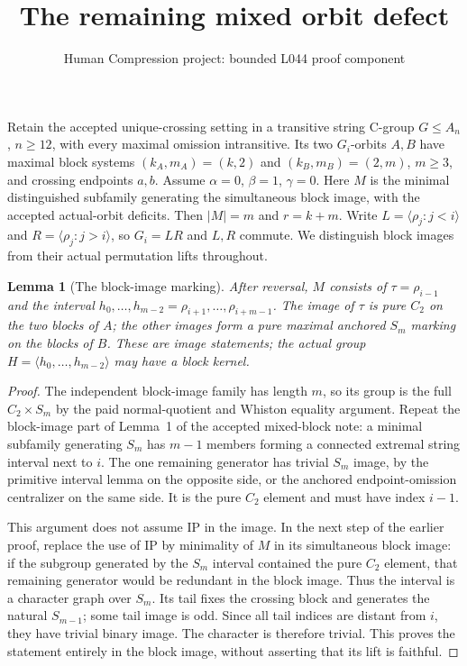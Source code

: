 \documentclass[11pt,a4paper]{article}
\title{The remaining mixed orbit defect}
\author{Human Compression project: bounded L044 proof component}
\date{}
\newtheorem{lemma}{Lemma}
\newcommand{\gen}[1]{\langle#1\rangle}
\begin{document}
\maketitle
Retain the accepted unique-crossing setting in a transitive string
C-group $G\leq A_n$, $n\geq12$, with every maximal omission
intransitive. Its two $G_i$-orbits $A,B$ have maximal block systems
$(k_A,m_A)=(k,2)$ and $(k_B,m_B)=(2,m)$, $m\geq3$, and crossing
endpoints $a,b$. Assume $\alpha=0$, $\beta=1$, $\gamma=0$.
Here $M$ is the minimal distinguished subfamily generating the
simultaneous block image, with the accepted actual-orbit deficits.
Then $|M|=m$ and $r=k+m$. Write
$L=\gen{\rho_j:j<i}$ and $R=\gen{\rho_j:j>i}$, so
$G_i=LR$ and $L,R$ commute. We distinguish block images from their
actual permutation lifts throughout.

\begin{lemma}[The block-image marking]
After reversal, $M$ consists of $\tau=\rho_{i-1}$ and the interval
$h_0,\ldots,h_{m-2}=\rho_{i+1},\ldots,\rho_{i+m-1}$.
The image of $\tau$ is pure $C_2$ on the two blocks of $A$;
the other images form a pure maximal anchored $S_m$ marking
on the blocks of $B$. These are image statements; the actual
group $H=\gen{h_0,\ldots,h_{m-2}}$ may have a block kernel.
\end{lemma}
\begin{proof}
The independent block-image family has length $m$, so its group
is the full $C_2\times S_m$ by the paid normal-quotient and
Whiston equality argument. Repeat the block-image part of Lemma~1
of the accepted mixed-block note: a minimal subfamily generating
$S_m$ has $m-1$ members forming a connected extremal string
interval next to $i$. The one remaining generator has trivial
$S_m$ image, by the primitive interval lemma on the opposite
side, or the anchored endpoint-omission centralizer on the same
side. It is the pure $C_2$ element and must have index $i-1$.

This argument does not assume IP in the image. In the next step
of the earlier proof, replace the use of IP by minimality of
$M$ in its simultaneous block image: if the subgroup generated
by the $S_m$ interval contained the pure $C_2$ element, that
remaining generator would be redundant in the block image.
Thus the interval is a character graph over $S_m$. Its tail
fixes the crossing block and generates the natural $S_{m-1}$;
some tail image is odd. Since all tail indices are distant
from $i$, they have trivial binary image. The character is
therefore trivial. This proves the statement entirely in the
block image, without asserting that its lift is faithful.
\end{proof}
\end{document}
